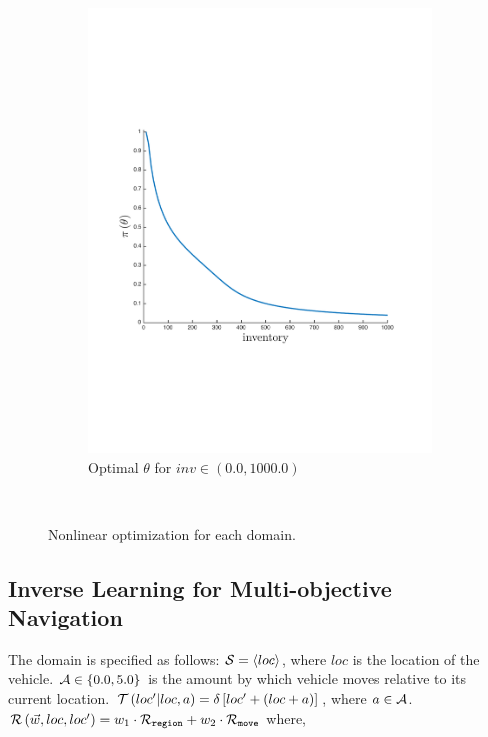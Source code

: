 {\begin{figure}[ht]
\begin{subfigure}{\columnwidth}
            \end{subfigure}\\
            \begin{subfigure}{\columnwidth}
                \centering
                \includegraphics[width=0.55\columnwidth]{images/oe_opt_new}
                \caption{Optimal {\footnotesize $ \theta $} for {\footnotesize $ inv \in \left(0.0, 1000.0 \right) $}}\label{fig:oe_opt}
            \end{subfigure}\\
        \caption{Nonlinear optimization for each domain.}        
        \label{tab:opt_results}
        \vspace{-3mm}
    \end{figure}
}

\subsection{Inverse Learning for Multi-objective Navigation}
\label{sec:results_navigation}

The domain is specified as follows: {\footnotesize $ \mathcal{S} = \left\langle loc \right\rangle$}, where $ loc $ is the location of the vehicle. {\footnotesize $ \mathcal{A} \in \left\lbrace 0.0, 5.0 \right\rbrace $} is the amount by which vehicle moves relative to its current location. {\footnotesize $ \mathcal{T}\left( loc' | loc, a \right) = \delta \left[ loc' + (loc + a) \right] $}, where {\footnotesize $ a \in \mathcal{A} $}. {\footnotesize $ \mathcal{R}\left(\vec{w}, loc, loc'\right) = w_1 \cdot \mathcal{R}_{\mathtt{region}} + w_2 \cdot \mathcal{R}_{\mathtt{move}} $} where,

